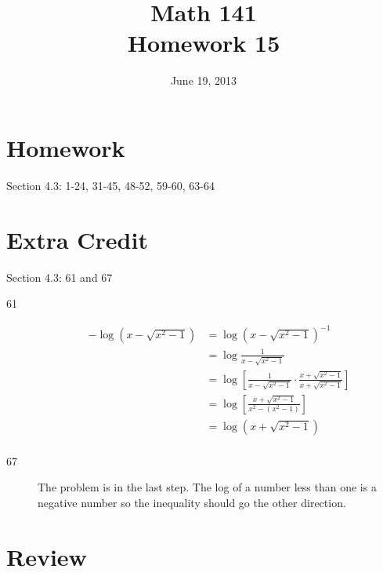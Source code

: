 \documentclass{exam}
\date{June 19, 2013}
\author{}
\title{Math 141 \\ Homework 15}
\begin{document}
  \maketitle

  \section{Homework}

  Section 4.3: 1-24, 31-45, 48-52, 59-60, 63-64

  \ifprintanswers
    \pagebreak
  \fi

  \section{Extra Credit}
  Section 4.3: 61 and 67

  \ifprintanswers
    \begin{description}
      \item[61]
        \begin{align*}
          - \log(x - \sqrt{x^2 - 1}) &= \log(x - \sqrt{x^2 - 1})^{-1} \\
                                     &= \log \frac{1}{x - \sqrt{x^2 - 1}} \\
                                     &= \log \left[ \frac{1}{x - \sqrt{x^2 - 1}} \cdot \frac{x + \sqrt{x^2 - 1}}{x + \sqrt{x^2 - 1}} \right] \\
                                     &= \log \left[ \frac{x + \sqrt{x^2 - 1}}{x^2 - (x^2 - 1)} \right] \\
                                     &= \log ( x + \sqrt{x^2 - 1} ) \\
        \end{align*}

      \item[67]
        The problem is in the last step.  The log of a number less than one is a negative number so the inequality should go the other direction.

    \end{description}
  \fi

  \ifprintanswers
    \pagebreak
  \fi

  \section{Review}
\end{document}
